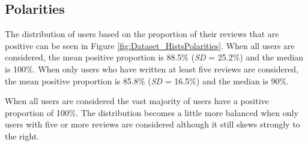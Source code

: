 \subsection{Polarities} \label{sec:Dataset_Reviews_P}

The distribution of users based on the proportion of their reviews that are positive can be seen in Figure \ref{fig:Dataset_HistsPolarities}. When all users are considered, the mean positive proportion is 88.5\% (\textit{SD} = 25.2\%) and the median is 100\%. When only users who have written at least five reviews are considered, the mean positive proportion is 85.8\% (\textit{SD} = 16.5\%) and the median is 90\%.

When all users are considered the vast majority of users have a positive proportion of 100\%. The distribution becomes a little more balanced when only users with five or more reviews are considered although it still skews strongly to the right.

